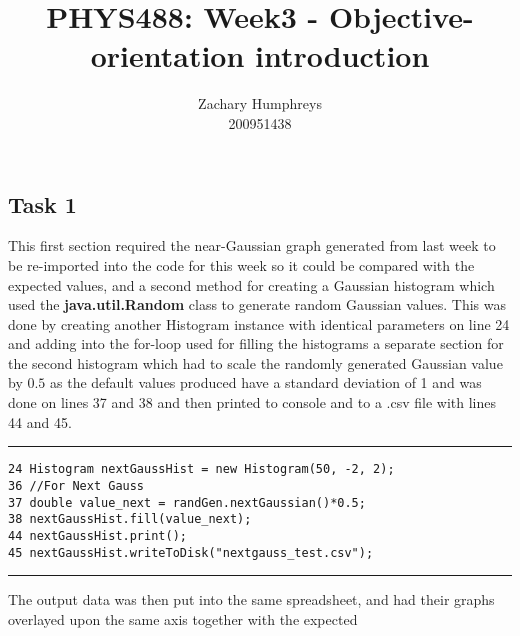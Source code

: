 \documentclass{article}
\title{PHYS488: Week3 - Objective-orientation introduction}
\author{Zachary Humphreys \\ 200951438}
\begin{document}
	\maketitle
	\begin{abstract}
		\begin{center}
		\textit{}
		\end{center}
	\end{abstract}
\begin{multicols}{2}
\section{Task 1}
This first section required the near-Gaussian graph generated from last week to be re-imported into the code for this week so it could be compared with the expected values, and a second method for creating a Gaussian histogram which used the \textbf{java.util.Random} class to generate random Gaussian values. This was done by creating another Histogram instance with identical parameters on line 24 and adding into the for-loop used for filling the histograms a separate section for the second histogram which had to scale the randomly generated Gaussian value by $0.5$ as the default values produced have a standard deviation of 1 and was done on lines 37 and 38 and then printed to console and to a .csv file with lines 44 and 45.
\begin{table*}[t]
	\hrule
	\begin{lstlisting}
24 Histogram nextGaussHist = new Histogram(50, -2, 2); 
36 //For Next Gauss                             
37 double value_next = randGen.nextGaussian()*0.5;
38 nextGaussHist.fill(value_next);
44 nextGaussHist.print();                            
45 nextGaussHist.writeToDisk("nextgauss_test.csv");
	\end{lstlisting}
	\hrule
\end{table*}
The output data was then put into the same spreadsheet, and had their graphs overlayed upon the same axis together with the expected 
\end{multicols}
\end{document}
